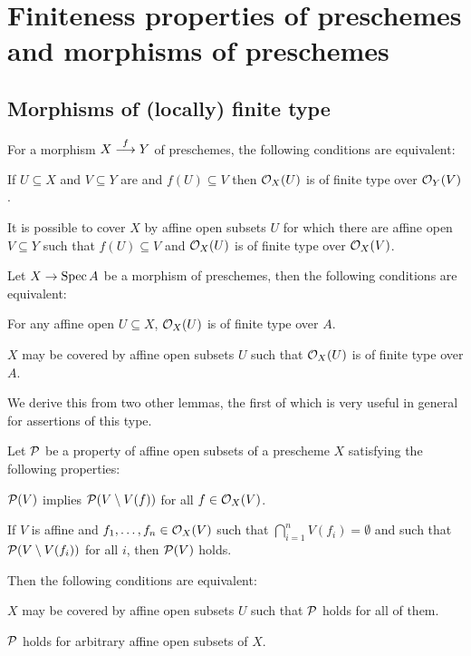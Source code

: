 \documentclass[a4paper,parskip=half,numbers=enddot, DIV=12]{scrreprt}
\begin{document}
\section{Finiteness properties of preschemes and morphisms of preschemes}

\subsection{Morphisms of (locally) finite type}
\begin{prop}
    For a morphism $X\morphism[f] Y$ of preschemes, the following conditions are equivalent:
    \begin{alphanumerate}
    \item 
        If $U\subseteq X$ and $V\subseteq Y$ are and $f(U)\subseteq V$ then $\mathcal{O}_X(U)$ is of finite type over $\mathcal{O}_Y(V)$.
    \item 
        It is possible to cover $X$ by affine open subsets $U$ for which there are affine open $V\subseteq Y$ such that $f(U) \subseteq V$ and $\mathcal{O}_X(U)$ is of finite type over $\mathcal{O}_X(V)$.
    \end{alphanumerate}
\end{prop}
\begin{lem}
    Let $X\morphism \Spec A$ be a morphism of preschemes, then the following conditions are equivalent:
    \begin{alphanumerate}
    \item   
        For any affine open $U\subseteq X$, $\mathcal{O}_X(U)$ is of finite type over $A$.
    \item 
        $X$ may be covered by affine open subsets $U$ such that $\mathcal{O}_X(U)$ is of finite type over $A$.
    \end{alphanumerate}
\end{lem}
We derive this from two other lemmas, the first of which is very useful in general for assertions of this type.
\begin{lem}
    Let $\mathcal{P}$ be a property of affine open subsets of a prescheme $X$ satisfying the following properties:
    \begin{alphanumerate}
    \item[\itememph{\alpha}] 
        $\mathcal{P}(V)$ implies $\mathcal{P}(V\setminus V(f))$ for all $f\in \mathcal{O}_X(V)$.
    \item[\itememph{\beta}] 
        If $V$ is affine and $f_1,\ldots,f_n \in \mathcal{O}_X(V)$ such that $\bigcap_{i=1}^n V(f_i)=\emptyset$ and such that $\mathcal{P}(V\setminus V(f_i))$ for all $i$, then $\mathcal{P}(V)$ holds.
    \end{alphanumerate}
    Then the following conditions are equivalent:
    \begin{alphanumerate}
      \item
        $X$ may be covered by affine open subsets $U$ such that $\mathcal{P}$ holds for all of them.
    \item
        $\mathcal{P}$ holds for arbitrary affine open subsets of $X$.
    \end{alphanumerate}
\end{lem}
\end{document}
